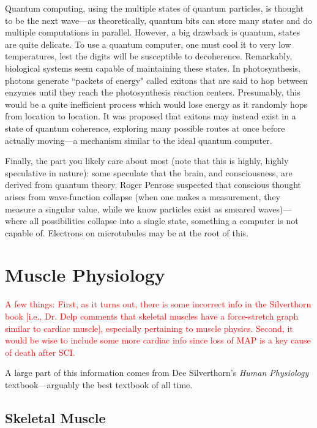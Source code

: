     Quantum computing, using the multiple states of quantum particles, is thought to be the next wave---as theoretically, quantum bits can store many states and do multiple computations in parallel. However, a big drawback is quantum, states are quite delicate. To use a quantum computer, one must cool it to very low temperatures, lest the digits will be susceptible to decoherence. Remarkably, biological systems seem capable of maintaining these states. In photosynthesis, photons generate ``packets of energy" called exitons that are said to hop between enzymes until they reach the photosynthesis reaction centers. Presumably, this would be a quite inefficient process which would lose energy as it randomly hops from location to location. It was proposed that exitons may instead exist in a state of quantum coherence, exploring many possible routes at once before actually moving---a mechanism similar to the ideal quantum computer. \newline

    Finally, the part you likely care about most (note that this is highly, highly speculative in nature): some speculate that the brain, and consciousness, are derived from quantum theory. Roger Penrose suspected that conscious thought arises from wave-function collapse (when one makes a measurement, they measure a singular value, while we know particles exist as smeared waves)---where all possibilities collapse into a single state, something a computer is not capable of. Electrons on microtubules may be at the root of this. 





\chapter{Muscle Physiology}

\textcolor{red}{A few things: First, as it turns out, there is some incorrect info in the Silverthorn book [i.e., Dr. Delp comments that skeletal muscles have a force-stretch graph similar to cardiac muscle], especially pertaining to muscle physics. Second, it would be wise to include some more cardiac info since loss of MAP is a key cause of death after SCI.}\newline

A large part of this information comes from Dee Silverthorn's \textit{Human Physiology} textbook---arguably the best textbook of all time.\newline

\section{Skeletal Muscle}
